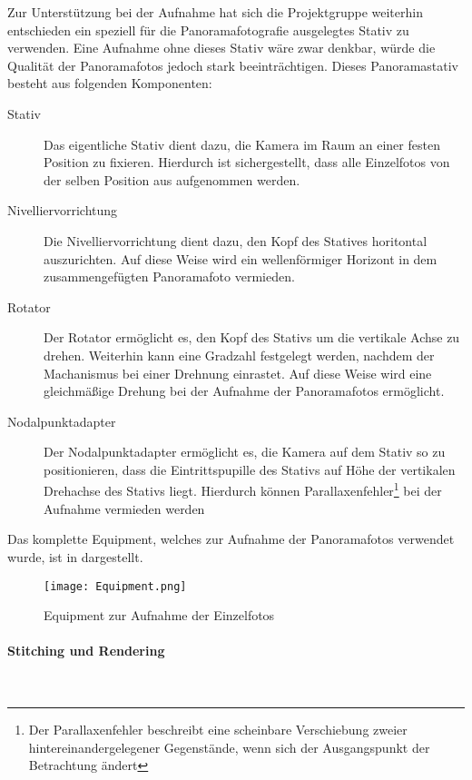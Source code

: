 Zur Unterstützung bei der Aufnahme hat sich die Projektgruppe weiterhin
entschieden ein speziell für die Panoramafotografie ausgelegtes Stativ zu
verwenden. Eine Aufnahme ohne dieses Stativ wäre zwar denkbar, würde die
Qualität der Panoramafotos jedoch stark beeinträchtigen. Dieses Panoramastativ
besteht aus folgenden Komponenten:

\begin{description}
\item[Stativ] Das eigentliche Stativ dient dazu, die Kamera im Raum an einer
festen Position zu fixieren. Hierdurch ist sichergestellt, dass alle
Einzelfotos von der selben Position aus aufgenommen werden.
\item[Nivelliervorrichtung] Die Nivelliervorrichtung dient dazu, den Kopf des
Statives horitontal auszurichten. Auf diese Weise wird ein wellenförmiger
Horizont in dem zusammengefügten Panoramafoto vermieden.
\item[Rotator] Der Rotator ermöglicht es, den Kopf des Stativs um die vertikale
Achse zu drehen. Weiterhin kann eine Gradzahl festgelegt werden, nachdem der
Machanismus bei einer Drehnung einrastet. Auf diese Weise wird eine gleichmäßige
Drehung bei der Aufnahme der Panoramafotos ermöglicht.
\item[Nodalpunktadapter] Der Nodalpunktadapter ermöglicht es, die Kamera auf
dem Stativ so zu positionieren, dass die Eintrittspupille des Stativs auf Höhe
der vertikalen Drehachse des Stativs liegt. Hierdurch können
Parallaxenfehler\footnote{Der Parallaxenfehler beschreibt eine scheinbare
Verschiebung zweier hintereinandergelegener Gegenstände, wenn sich der
Ausgangspunkt der Betrachtung ändert} bei der Aufnahme vermieden werden
\end{description}

Das komplette Equipment, welches zur Aufnahme der Panoramafotos verwendet wurde,
ist in  dargestellt.

\begin{figure}[htb]
\centering
\texttt{[image: Equipment.png]}
\caption[Equipment zur Aufnahme der Einzelfotos]{Equipment zur Aufnahme der Einzelfotos\protect\footnotemark}
\label{fig:Equipment}
\end{figure}

\paragraph{Stitching und Rendering} \hfill \\

